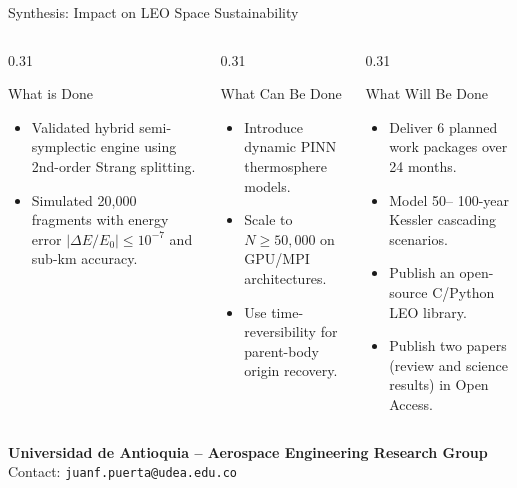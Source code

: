 \documentclass[aspectratio=169,10pt]{beamer}
\begin{document}
\begin{frame}{Synthesis: Impact on LEO Space Sustainability}
    \begin{columns}[t]
        \begin{column}{0.31\textwidth}
            \begin{block}{What is Done}
                \small
                \begin{itemize}
                    \setlength{\itemsep}{2pt}
                    \item Validated hybrid semi-symplectic engine using 2nd-order Strang splitting.
                    \item Simulated 20,000 fragments with energy error $|\Delta E/E_0| \le 10^{-7}$ and sub-km accuracy.
                \end{itemize}
            \end{block}
        \end{column}

        \begin{column}{0.31\textwidth}
            \begin{exampleblock}{What Can Be Done}
                \small
                \begin{itemize}
                    \setlength{\itemsep}{2pt}
                    \item Introduce dynamic PINN thermosphere models.
                    \item Scale to $N \ge 50,000$ on GPU/MPI architectures.
                    \item Use time-reversibility for parent-body origin recovery.
                \end{itemize}
            \end{exampleblock}
        \end{column}

        \begin{column}{0.31\textwidth}
            \begin{alertblock}{What Will Be Done}
                \small
                \begin{itemize}
                    \setlength{\itemsep}{2pt}
                    \item Deliver 6 planned work packages over 24 months.
                    \item Model 50-- 100-year Kessler cascading scenarios.
                    \item Publish an open-source C/Python LEO library.
                    \item Publish two papers (review and science results) in Open Access.
                \end{itemize}
            \end{alertblock}
        \end{column}
    \end{columns}

    \vspace{0.25cm}
    \centering
    \footnotesize
    \textbf{\textcolor{UdeAGreen}{Universidad de Antioquia -- Aerospace Engineering Research Group}} \\
    Contact: \texttt{juanf.puerta@udea.edu.co}
\end{frame}
\end{document}
